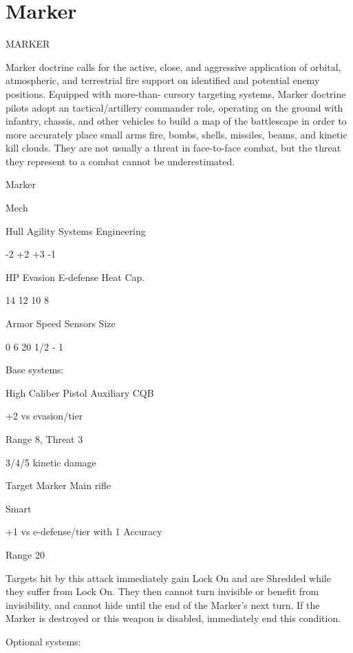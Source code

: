 \section{Marker}
                                                MARKER  

Marker doctrine calls for the active, close, and aggressive application of orbital, atmospheric, and  
terrestrial fire support on identified and potential enemy positions. Equipped with more-than- 
cursory targeting systems, Marker doctrine pilots adopt an tactical/artillery commander role,  
operating on the ground with infantry, chassis, and other vehicles to build a map of the  
battlescape in order to more accurately place small arms fire, bombs, shells, missiles, beams, and  
kinetic kill clouds. They are not usually a threat in face-to-face combat, but the threat they  
represent to a combat cannot be underestimated.   

       Marker 

       Mech 

       Hull       Agility     Systems       Engineering 

       -2         +2          +3            -1 

       HP         Evasion     E-defense     Heat Cap. 

       14         12          10            8 

       Armor      Speed       Sensors       Size 

       0          6           20            1/2 - 1 

Base systems:
 
High Caliber Pistol  
Auxiliary CQB
 
+2 vs evasion/tier
 
Range 8, Threat 3
 
3/4/5 kinetic damage
 

Target Marker  
Main rifle
 
Smart
 
+1 vs e-defense/tier with 1 Accuracy
 
Range 20
 
Targets hit by this attack immediately gain Lock On and are Shredded while they suffer from  
Lock On. They then cannot turn invisible or benefit from invisibility, and cannot hide until the end  
of the Marker’s next turn. If the Marker is destroyed or this weapon is disabled, immediately end  
this condition.
 

Optional systems:  

